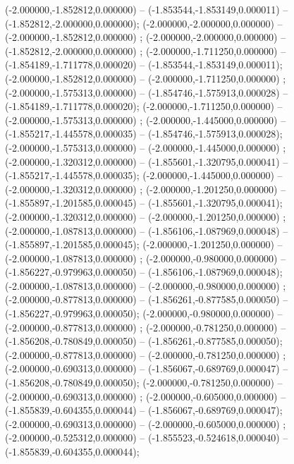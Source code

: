  (-2.000000,-1.852812,0.000000) -- (-1.853544,-1.853149,0.000011) -- (-1.852812,-2.000000,0.000000);
 (-2.000000,-2.000000,0.000000) -- (-2.000000,-1.852812,0.000000) ;
 (-2.000000,-2.000000,0.000000) -- (-1.852812,-2.000000,0.000000) ;
 (-2.000000,-1.711250,0.000000) -- (-1.854189,-1.711778,0.000020) -- (-1.853544,-1.853149,0.000011);
 (-2.000000,-1.852812,0.000000) -- (-2.000000,-1.711250,0.000000) ;
 (-2.000000,-1.575313,0.000000) -- (-1.854746,-1.575913,0.000028) -- (-1.854189,-1.711778,0.000020);
 (-2.000000,-1.711250,0.000000) -- (-2.000000,-1.575313,0.000000) ;
 (-2.000000,-1.445000,0.000000) -- (-1.855217,-1.445578,0.000035) -- (-1.854746,-1.575913,0.000028);
 (-2.000000,-1.575313,0.000000) -- (-2.000000,-1.445000,0.000000) ;
 (-2.000000,-1.320312,0.000000) -- (-1.855601,-1.320795,0.000041) -- (-1.855217,-1.445578,0.000035);
 (-2.000000,-1.445000,0.000000) -- (-2.000000,-1.320312,0.000000) ;
 (-2.000000,-1.201250,0.000000) -- (-1.855897,-1.201585,0.000045) -- (-1.855601,-1.320795,0.000041);
 (-2.000000,-1.320312,0.000000) -- (-2.000000,-1.201250,0.000000) ;
 (-2.000000,-1.087813,0.000000) -- (-1.856106,-1.087969,0.000048) -- (-1.855897,-1.201585,0.000045);
 (-2.000000,-1.201250,0.000000) -- (-2.000000,-1.087813,0.000000) ;
 (-2.000000,-0.980000,0.000000) -- (-1.856227,-0.979963,0.000050) -- (-1.856106,-1.087969,0.000048);
 (-2.000000,-1.087813,0.000000) -- (-2.000000,-0.980000,0.000000) ;
 (-2.000000,-0.877813,0.000000) -- (-1.856261,-0.877585,0.000050) -- (-1.856227,-0.979963,0.000050);
 (-2.000000,-0.980000,0.000000) -- (-2.000000,-0.877813,0.000000) ;
 (-2.000000,-0.781250,0.000000) -- (-1.856208,-0.780849,0.000050) -- (-1.856261,-0.877585,0.000050);
 (-2.000000,-0.877813,0.000000) -- (-2.000000,-0.781250,0.000000) ;
 (-2.000000,-0.690313,0.000000) -- (-1.856067,-0.689769,0.000047) -- (-1.856208,-0.780849,0.000050);
 (-2.000000,-0.781250,0.000000) -- (-2.000000,-0.690313,0.000000) ;
 (-2.000000,-0.605000,0.000000) -- (-1.855839,-0.604355,0.000044) -- (-1.856067,-0.689769,0.000047);
 (-2.000000,-0.690313,0.000000) -- (-2.000000,-0.605000,0.000000) ;
 (-2.000000,-0.525312,0.000000) -- (-1.855523,-0.524618,0.000040) -- (-1.855839,-0.604355,0.000044);
